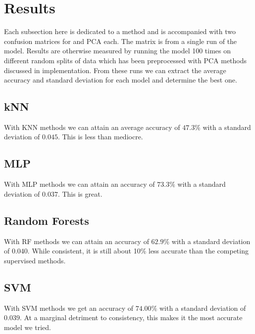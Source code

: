 \section{Results}

Each subsection here is dedicated to a method and is accompanied with two confusion matrices for \tsne and PCA each. The matrix is from a single run of the model. Results are otherwise measured by running the model 100 times on different random splits of data which has been preprocessed with PCA methods discussed in implementation. From these runs we can extract the average accuracy and standard deviation for each model and determine the best one.

\subsection{kNN}


With KNN methods we can attain an average accuracy of $47.3\%$ with a standard deviation of $0.045$. This is less than mediocre.

\subsection{MLP}


With MLP methods we can attain an accuracy of $73.3\%$ with a standard deviation of $0.037$. This is great.

\subsection{Random Forests}


With RF methods we can attain an accuracy of $62.9\%$ with a standard deviation of $0.040$. While consistent, it is still about 10\% less accurate than the competing supervised methods.

\subsection{SVM}


With SVM methods we get an accuracy of $74.00\%$ with a standard deviation of $0.039$. At a marginal detriment to consistency, this makes it the most accurate model we tried.